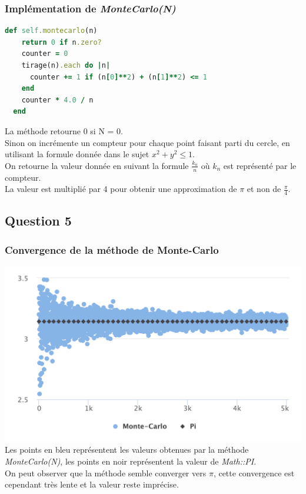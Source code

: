 \documentclass[a4paper,10pt]{report}
\begin{document}
\subsubsection{Implémentation de \textit{MonteCarlo(N)}}
\begin{lstlisting}[language=Ruby]
  def self.montecarlo(n)
    return 0 if n.zero?
    counter = 0
    tirage(n).each do |n|
      counter += 1 if (n[0]**2) + (n[1]**2) <= 1
    end
    counter * 4.0 / n
  end
\end{lstlisting}
La méthode retourne 0 si N = 0.\\
Sinon on incrémente un compteur pour chaque point faisant parti du cercle, en utilisant la formule donnée dans le sujet $x^2 + y^2 \leq 1$.\\
On retourne la valeur donnée en suivant la formule $\frac{k_{n}}{n}$ où $k_{n}$ est représenté par le compteur.\\
La valeur est multiplié par 4 pour obtenir une approximation de $\pi$ et non de $\frac{\pi}{4}$.
\bigskip

\subsection{Question 5}
\subsubsection{Convergence de la méthode de Monte-Carlo}
\includegraphics[scale=0.75]{images/question_2_5.png}
Les points en bleu représentent les valeurs obtenues par la méthode \textit{MonteCarlo(N)}, les points en noir représentent la valeur de \textit{Math::PI}.\\
On peut observer que la méthode semble converger vers $\pi$, cette convergence est cependant très lente et la valeur reste imprécise.\\
\bigskip
\end{document}

